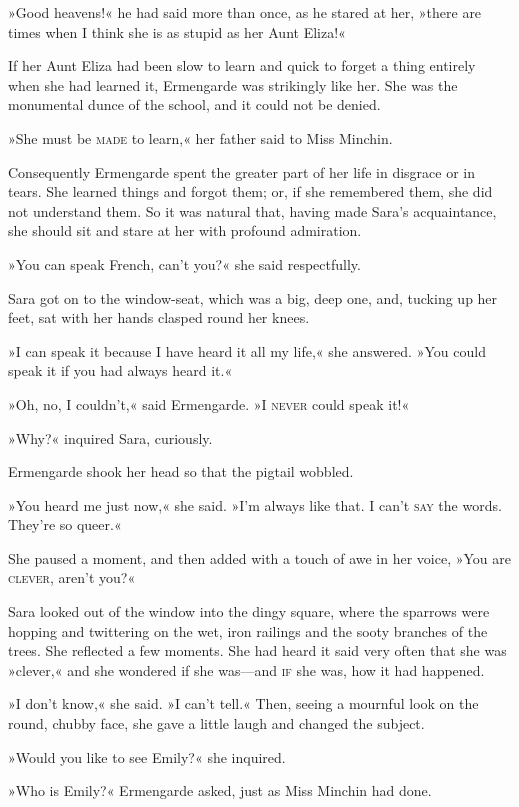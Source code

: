 »Good heavens!« he had said more than once, as he stared at her, »there are times when I think she is as stupid as her Aunt Eliza!«

If her Aunt Eliza had been slow to learn and quick to forget a thing entirely when she had learned it, Ermengarde was strikingly like her. She was the monumental dunce of the school, and it could not be denied.

»She must be \textsc{made} to learn,« her father said to Miss Minchin.

Consequently Ermengarde spent the greater part of her life in disgrace or in tears. She learned things and forgot them; or, if she remembered them, she did not understand them. So it was natural that, having made Sara's acquaintance, she should sit and stare at her with profound admiration.

»You can speak French, can't you?« she said respectfully.

Sara got on to the window-seat, which was a big, deep one, and, tucking up her feet, sat with her hands clasped round her knees.

»I can speak it because I have heard it all my life,« she answered. »You could speak it if you had always heard it.«

»Oh, no, I couldn't,« said Ermengarde. »I \textsc{never} could speak it!«

»Why?« inquired Sara, curiously.

Ermengarde shook her head so that the pigtail wobbled.

»You heard me just now,« she said. »I'm always like that. I can't \textsc{say} the words. They're so queer.«

She paused a moment, and then added with a touch of awe in her voice, »You are \textsc{clever}, aren't you?«

Sara looked out of the window into the dingy square, where the sparrows were hopping and twittering on the wet, iron railings and the sooty branches of the trees. She reflected a few moments. She had heard it said very often that she was »clever,« and she wondered if she was—and \textsc{if} she was, how it had happened.

»I don't know,« she said. »I can't tell.« Then, seeing a mournful look on the round, chubby face, she gave a little laugh and changed the subject.

»Would you like to see Emily?« she inquired.

»Who is Emily?« Ermengarde asked, just as Miss Minchin had done.

